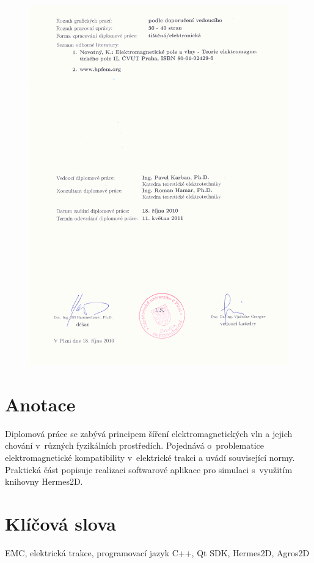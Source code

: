 \begin{figure}[!h]
	\centering
	\includegraphics[width=15cm]{zadani2.png}
\end{figure}
\newpage

\section*{Anotace}
Diplomová práce se zabývá principem šíření elektromagnetických vln a jejich chování v~různých fyzikálních prostředích. Pojednává o~problematice elektromagnetické kompatibility v~elektrické trakci a uvádí související normy. Praktická část popisuje realizaci softwarové aplikace pro simulaci s~využitím knihovny Hermes2D.

\section*{Klíčová slova}
EMC, elektrická trakce, programovací jazyk C++,  Qt SDK, Hermes2D, Agros2D

